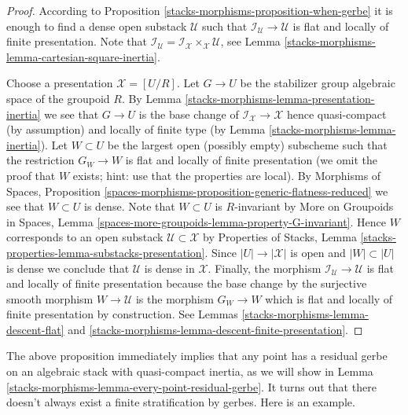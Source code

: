 \begin{proof}
According to
Proposition \ref{stacks-morphisms-proposition-when-gerbe}
it is enough to find a dense open substack $\mathcal{U}$ such that
$\mathcal{I}_\mathcal{U} \to \mathcal{U}$ is flat and locally of finite
presentation. Note that
$\mathcal{I}_\mathcal{U} =
\mathcal{I}_\mathcal{X} \times_\mathcal{X} \mathcal{U}$, see
Lemma \ref{stacks-morphisms-lemma-cartesian-square-inertia}.

\medskip\noindent
Choose a presentation $\mathcal{X} = [U/R]$. Let $G \to U$ be the stabilizer
group algebraic space of the groupoid $R$. By
Lemma \ref{stacks-morphisms-lemma-presentation-inertia}
we see that $G \to U$ is the base change of
$\mathcal{I}_\mathcal{X} \to \mathcal{X}$ hence quasi-compact (by assumption)
and locally of finite type (by
Lemma \ref{stacks-morphisms-lemma-inertia}).
Let $W \subset U$ be the largest open (possibly empty) subscheme such that
the restriction $G_W \to W$ is flat and locally of finite presentation
(we omit the proof that $W$ exists; hint: use that the properties are local).
By
Morphisms of Spaces, Proposition
\ref{spaces-morphisms-proposition-generic-flatness-reduced}
we see that $W \subset U$ is dense. Note that $W \subset U$ is $R$-invariant
by
More on Groupoids in Spaces, Lemma
\ref{spaces-more-groupoids-lemma-property-G-invariant}.
Hence $W$ corresponds to an open substack $\mathcal{U} \subset \mathcal{X}$ by
Properties of Stacks, Lemma
\ref{stacks-properties-lemma-substacks-presentation}.
Since $|U| \to |\mathcal{X}|$ is open and $|W| \subset |U|$ is dense we
conclude that $\mathcal{U}$ is dense in $\mathcal{X}$.
Finally, the morphism $\mathcal{I}_\mathcal{U} \to \mathcal{U}$
is flat and locally of finite presentation because the base change by
the surjective smooth morphism $W \to \mathcal{U}$ is the morphism
$G_W \to W$ which is flat and locally of finite presentation by construction.
See
Lemmas \ref{stacks-morphisms-lemma-descent-flat} and
\ref{stacks-morphisms-lemma-descent-finite-presentation}.
\end{proof}

The above proposition immediately implies that any point has a residual
gerbe on an algebraic stack with quasi-compact inertia, as we will show in
Lemma \ref{stacks-morphisms-lemma-every-point-residual-gerbe}.
It turns out that there doesn't always exist a finite stratification
by gerbes. Here is an example.

